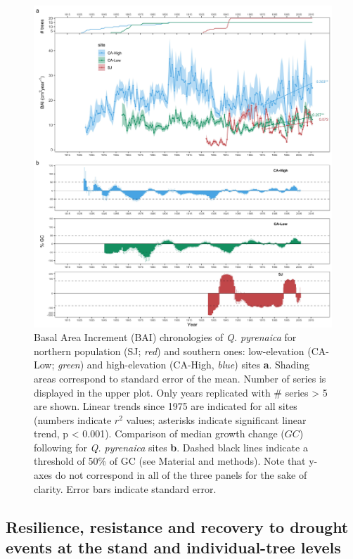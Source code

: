 \begin{figure}
\centering
\includegraphics[width=\textwidth]{img/dendro/dendro-cronos-bai-gc.jpg}\caption{
Basal Area Increment (BAI) chronologies of \textit{Q. pyrenaica} for northern population (SJ; \textit{red}) and southern ones: low-elevation (CA-Low; \textit{green}) and high-elevation (CA-High, \textit{blue}) sites \textbf{a}. Shading areas correspond to standard error of the mean. Number of series is displayed in the upper plot. Only years replicated with \# series \textgreater{} 5 are shown. Linear trends since 1975 are indicated for all sites (numbers indicate \(r^2\) values; asterisks indicate significant linear trend, p \textless{} 0.001). Comparison of median growth change (\(GC\)) following \textcite{NowackiAbrams1997RadialgrowthAveraging} for \textit{Q. pyrenaica} sites \textbf{b}. Dashed black lines indicate a threshold of 50\% of GC (see Material and methods). Note that y-axes do not correspond in all of the three panels for the sake of clarity. Error bars indicate standard error.}
\label{fig:dendro:bai}
\end{figure}

\subsection{Resilience, resistance and recovery to drought events at the stand and individual-tree levels}\label{sec:dendro:ResultsResilience}

